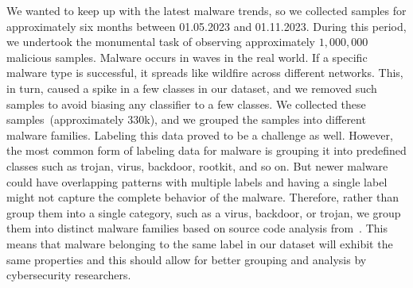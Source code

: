 We wanted to keep up with the latest malware trends, so we collected samples for approximately six months between 01.05.2023 and 01.11.2023.
During this period, we undertook the monumental task of observing approximately $1,000,000$ malicious samples.
Malware occurs in waves in the real world. If a specific malware type is successful, it spreads like wildfire across different networks.
This, in turn, caused a spike in a few classes in our dataset, and we removed such samples to avoid biasing any classifier to a few classes.
We collected these samples~(approximately 330k), and we grouped the samples into different malware families.
Labeling this data proved to be a challenge as well.
However, the most common form of labeling data for malware is grouping it into predefined classes such as trojan, virus, backdoor, rootkit, and so on.
But newer malware could have overlapping patterns with multiple labels and having a single label might not capture the complete behavior of the malware.
Therefore, rather than group them into a single category, such as a virus, backdoor, or trojan, we group them into distinct malware families based on source code analysis from~\gdata.
This means that malware belonging to the same label in our dataset will exhibit the same properties and this should allow for better grouping and analysis by cybersecurity researchers.

